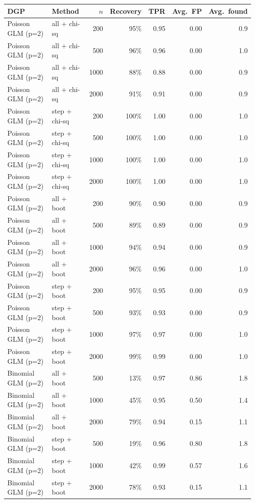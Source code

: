 \begin{tabular}{llrrrrr}
\toprule
DGP & Method & $n$ & Recovery & TPR & Avg.\ FP & Avg.\ found \\
\midrule
Poisson GLM (p=2) & all + chi-sq & 200 & 95\% & 0.95 & 0.00 & 0.9 \\
Poisson GLM (p=2) & all + chi-sq & 500 & 96\% & 0.96 & 0.00 & 1.0 \\
Poisson GLM (p=2) & all + chi-sq & 1000 & 88\% & 0.88 & 0.00 & 0.9 \\
Poisson GLM (p=2) & all + chi-sq & 2000 & 91\% & 0.91 & 0.00 & 0.9 \\
Poisson GLM (p=2) & step + chi-sq & 200 & 100\% & 1.00 & 0.00 & 1.0 \\
Poisson GLM (p=2) & step + chi-sq & 500 & 100\% & 1.00 & 0.00 & 1.0 \\
Poisson GLM (p=2) & step + chi-sq & 1000 & 100\% & 1.00 & 0.00 & 1.0 \\
Poisson GLM (p=2) & step + chi-sq & 2000 & 100\% & 1.00 & 0.00 & 1.0 \\
Poisson GLM (p=2) & all + boot & 200 & 90\% & 0.90 & 0.00 & 0.9 \\
Poisson GLM (p=2) & all + boot & 500 & 89\% & 0.89 & 0.00 & 0.9 \\
Poisson GLM (p=2) & all + boot & 1000 & 94\% & 0.94 & 0.00 & 0.9 \\
Poisson GLM (p=2) & all + boot & 2000 & 96\% & 0.96 & 0.00 & 1.0 \\
Poisson GLM (p=2) & step + boot & 200 & 95\% & 0.95 & 0.00 & 0.9 \\
Poisson GLM (p=2) & step + boot & 500 & 93\% & 0.93 & 0.00 & 0.9 \\
Poisson GLM (p=2) & step + boot & 1000 & 97\% & 0.97 & 0.00 & 1.0 \\
Poisson GLM (p=2) & step + boot & 2000 & 99\% & 0.99 & 0.00 & 1.0 \\
\midrule
Binomial GLM (p=2) & all + boot & 500 & 13\% & 0.97 & 0.86 & 1.8 \\
Binomial GLM (p=2) & all + boot & 1000 & 45\% & 0.95 & 0.50 & 1.4 \\
Binomial GLM (p=2) & all + boot & 2000 & 79\% & 0.94 & 0.15 & 1.1 \\
Binomial GLM (p=2) & step + boot & 500 & 19\% & 0.96 & 0.80 & 1.8 \\
Binomial GLM (p=2) & step + boot & 1000 & 42\% & 0.99 & 0.57 & 1.6 \\
Binomial GLM (p=2) & step + boot & 2000 & 78\% & 0.93 & 0.15 & 1.1 \\
\midrule

\end{tabular}
